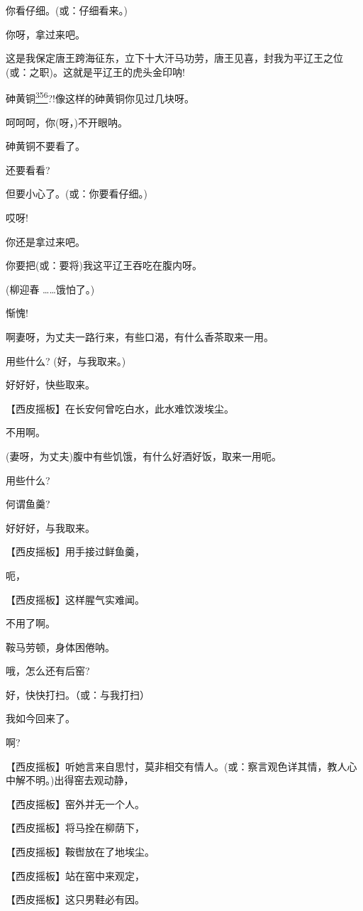 你看仔细。(或：仔细看来。)

你呀，拿过来吧。

这是我保定唐王跨海征东，立下十大汗马功劳，唐王见喜，封我为平辽王之位(或：之职)。这就是平辽王的虎头金印呐!

砷黄铜\protect\hyperlink{fn356}{\textsuperscript{356}}?!像这样的砷黄铜你见过几块呀。

呵呵呵，你(呀，)不开眼呐。

砷黄铜不要看了。

还要看看?

但要小心了。(或：你要看仔细。)

哎呀!

你还是拿过来吧。

你要把(或：要将)我这平辽王吞吃在腹内呀。

(柳迎春 \ldots{}\ldots{}饿怕了。)

惭愧!

啊妻呀，为丈夫一路行来，有些口渴，有什么香茶取来一用。

用些什么? (好，与我取来。)

好好好，快些取来。

【西皮摇板】在长安何曾吃白水，此水难饮泼埃尘。

不用啊。

(妻呀，为丈夫)腹中有些饥饿，有什么好酒好饭，取来一用呃。

用些什么?

何谓鱼羹?

好好好，与我取来。

【西皮摇板】用手接过鲜鱼羹，

呃，

【西皮摇板】这样腥气实难闻。

不用了啊。

鞍马劳顿，身体困倦呐。

哦，怎么还有后窑?

好，快快打扫。（或：与我打扫）

我如今回来了。

啊?

【西皮摇板】听她言来自思忖，莫非相交有情人。(或：察言观色详其情，教人心中解不明。)出得窑去观动静，

【西皮摇板】窑外并无一个人。

【西皮摇板】将马拴在柳荫下，

【西皮摇板】鞍辔放在了地埃尘。

【西皮摇板】站在窑中来观定，

【西皮摇板】这只男鞋必有因。

